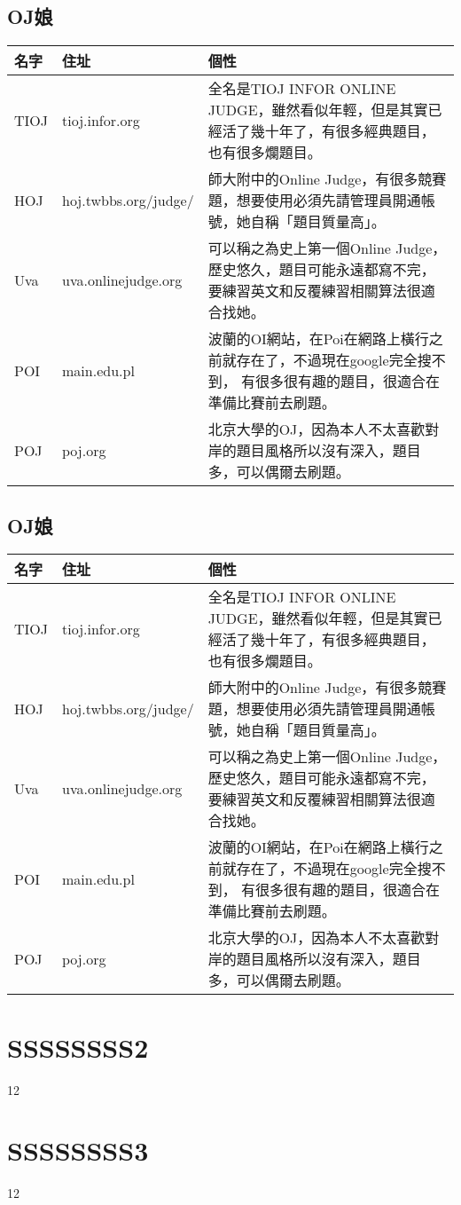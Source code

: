 \documentclass{article}
\begin{document}
\subsection{OJ娘}
\begin{tabular}[t]{llp{11cm}}
\hline
名字 & 住址 & 個性\\
\hline
TIOJ & tioj.infor.org &
全名是TIOJ INFOR ONLINE JUDGE，雖然看似年輕，但是其實已經活了幾十年了，有很多經典題目，
也有很多爛題目。\\
HOJ & hoj.twbbs.org/judge/ &
師大附中的Online Judge，有很多競賽題，想要使用必須先請管理員開通帳號，她自稱「題目質量高」。\\
Uva & uva.onlinejudge.org &
可以稱之為史上第一個Online Judge，歷史悠久，題目可能永遠都寫不完，要練習英文和反覆練習相關算法很適合找她。\\
POI & main.edu.pl &
波蘭的OI網站，在Poi在網路上橫行之前就存在了，不過現在google完全搜不到，
有很多很有趣的題目，很適合在準備比賽前去刷題。\\
POJ & poj.org &
北京大學的OJ，因為本人不太喜歡對岸的題目風格所以沒有深入，題目多，可以偶爾去刷題。\\
\hline
\end{tabular}
\subsection{OJ娘}
\begin{tabular}[t]{llp{11cm}}
\hline
名字 & 住址 & 個性\\
\hline
TIOJ & tioj.infor.org &
全名是TIOJ INFOR ONLINE JUDGE，雖然看似年輕，但是其實已經活了幾十年了，有很多經典題目，
也有很多爛題目。\\
HOJ & hoj.twbbs.org/judge/ &
師大附中的Online Judge，有很多競賽題，想要使用必須先請管理員開通帳號，她自稱「題目質量高」。\\
Uva & uva.onlinejudge.org &
可以稱之為史上第一個Online Judge，歷史悠久，題目可能永遠都寫不完，要練習英文和反覆練習相關算法很適合找她。\\
POI & main.edu.pl &
波蘭的OI網站，在Poi在網路上橫行之前就存在了，不過現在google完全搜不到，
有很多很有趣的題目，很適合在準備比賽前去刷題。\\
POJ & poj.org &
北京大學的OJ，因為本人不太喜歡對岸的題目風格所以沒有深入，題目多，可以偶爾去刷題。\\
\hline
\end{tabular}
\section{SSSSSSSS2}
12
\section{SSSSSSSS3}
12
\end{document}
